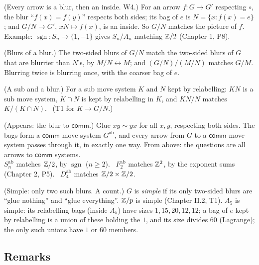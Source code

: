 \begin{lines}
\item[\lab{T1}] (Every arrow is a blur, then an inside. W4.) For an arrow $f : G \to G'$ respecting $\circ$, the blur ``$f(x) = f(y)$'' respects both sides; its bag of $e$ is $N = \{x : f(x) = e\}$; and $G/N \to G'$, $xN \mapsto f(x)$, is an inside. So $G/N$ matches the picture of $f$. \\
Example: $\operatorname{sgn} : S_n \to \{1, -1\}$ gives $S_n / A_n$ matching $\mathbb{Z}/2$ (Chapter 1, P8).
\item[\lab{T2}] (Blurs of a blur.) The two-sided blurs of $G/N$ match the two-sided blurs of $G$ that are blurrier than $N$'s, by $M/N \leftrightarrow M$; and $(G/N)/(M/N)$ matches $G/M$. Blurring twice is blurring once, with the coarser bag of $e$.
\item[\lab{T3}] (A sub and a blur.) For a sub move system $K$ and $N$ kept by relabelling: $KN$ is a sub move system, $K \cap N$ is kept by relabelling in $K$, and $KN/N$ matches $K/(K \cap N)$. \ (T1 for $K \to G/N$.)
\item[\lab{T4}] (Appears: the blur to $\mathsf{comm}$.) Glue $xy \sim yx$ for all $x, y$, respecting both sides. The bags form a $\mathsf{comm}$ move system $G^{\mathrm{ab}}$, and every arrow from $G$ to a $\mathsf{comm}$ move system passes through it, in exactly one way. From above: the questions are all arrows to $\mathsf{comm}$ systems. \\
$S_n^{\mathrm{ab}}$ matches $\mathbb{Z}/2$, by $\operatorname{sgn}$ ($n \ge 2$). \ $F_2^{\mathrm{ab}}$ matches $\mathbb{Z}^2$, by the exponent sums (Chapter 2, P5). \ $D_4^{\mathrm{ab}}$ matches $\mathbb{Z}/2 \times \mathbb{Z}/2$.
\item[\lab{T5}] (Simple: only two such blurs. A count.) $G$ is \emph{simple} if its only two-sided blurs are ``glue nothing'' and ``glue everything''. $\mathbb{Z}/p$ is simple (Chapter II.2, T1). $A_5$ is simple: its relabelling bags (inside $A_5$) have sizes $1, 15, 20, 12, 12$; a bag of $e$ kept by relabelling is a union of these holding the $1$, and its size divides $60$ (Lagrange); the only such unions have $1$ or $60$ members.
\end{lines}

\subsection*{Remarks}

